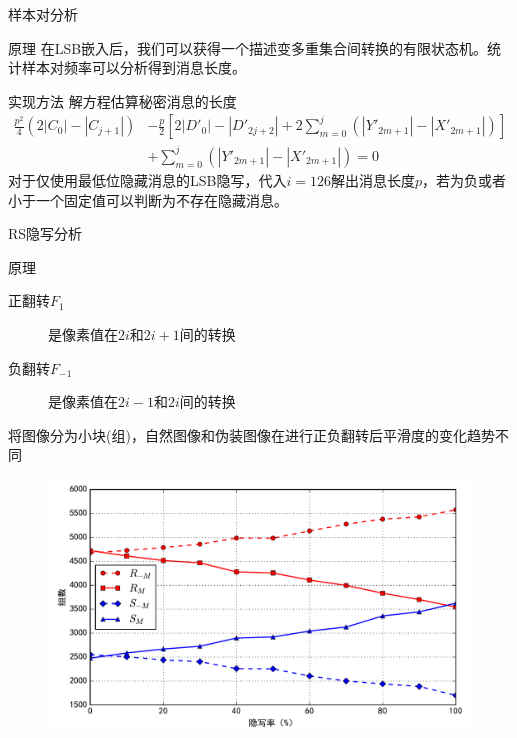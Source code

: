 \documentclass[14pt]{Bredelebeamer}
\begin{document}
\begin{frame}{样本对分析}
  \begin{exampleblock}{原理}
    在LSB嵌入后，我们可以获得一个描述变多重集合间转换的有限状态机。统计样本对频率可以分析得到消息长度。
  \end{exampleblock}

  \begin{block}{实现方法}
    解方程估算秘密消息的长度
    $$\begin{aligned}
    \frac{{{p^2}}}{4}\left( {2\left| {{C_0}} \right| - \left| {{C_{j + 1}}} \right|} \right) &- \frac{p}{2}\left[ {2\left| {D{'_0}} \right| - \left| {D{'_{2j + 2}}} \right| + 2\sum\limits_{m = 0}^j {\left( {\left| {Y{'_{2m + 1}}} \right| - \left| {X{'_{2m + 1}}} \right|} \right)} } \right] \\
    &+ \sum\limits_{m = 0}^j {\left( {\left| {Y{'_{2m + 1}}} \right| - \left| {X{'_{2m + 1}}} \right|} \right)}  = 0
    \end{aligned}$$
    对于仅使用最低位隐藏消息的LSB隐写，代入$i=126$解出消息长度$p$，若为负或者小于一个固定值可以判断为不存在隐藏消息。
  \end{block}
\end{frame}

\begin{frame}{RS隐写分析}
  \begin{exampleblock}{原理}
  \begin{description}
    \item[正翻转$F_1$]是像素值在$2i$和$2i+1$间的转换
    \item[负翻转$F_{-1}$]是像素值在$2i-1$和$2i$间的转换
  \end{description}
  将图像分为小块(组)，自然图像和伪装图像在进行正负翻转后平滑度的变化趋势不同
  \end{exampleblock}
  \begin{figure}
    \centering
    \includegraphics[width=.75\textwidth]{images/rsdemo}
  \end{figure}
\end{frame}
\end{document}
